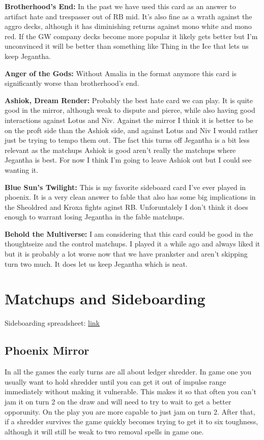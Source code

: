 \documentclass[12pt]{article}
\begin{document}
\vspace{0.4em}
\noindent \textbf{Brotherhood's End:}
In the past we have used this card as an answer to artifact hate and trespasser out of RB mid. It's also fine as a wrath against the aggro decks, although it has diminishing returns against mono white and mono red. If the GW company decks become more popular it likely gets better but I'm unconvinced it will be better than something like Thing in the Ice that lets us keep Jegantha.

\vspace{0.4em}
\noindent \textbf{Anger of the Gods:}
Without Amalia in the format anymore this card is significantly worse than brotherhood's end.

\vspace{0.4em}
\noindent \textbf{Ashiok, Dream Render:}
Probably the best hate card we can play. It is quite good in the mirror, although weak to dispute and pierce, while also having good interactions against Lotus and Niv. Against the mirror I think it is better to be on the proft side than the Ashiok side, and against Lotus and Niv I would rather just be trying to tempo them out. The fact this turns off Jegantha is a bit less relevant as the matchups Ashiok is good aren't really the matchups where Jegantha is best. For now I think I'm going to leave Ashiok out but I could see wanting it.

\vspace{0.4em}
\noindent \textbf{Blue Sun's Twilight:}
This is my favorite sideboard card I've ever played in phoenix. It is a very clean answer to fable that also has some big implications in the Sheoldred and Kroxa fights aginst RB. Unforuntalely I don't think it does enough to warrant losing Jegantha in the fable matchups.

\vspace{0.4em}
\noindent \textbf{Behold the Multiverse:}
I am considering that this card could be good in the thoughtseize and the control matchups. I played it a while ago and always liked it but it is probably a lot worse now that we have prankster and aren't skipping turn two much. It does let us keep Jegantha which is neat.

\clearpage
\section{Matchups and Sideboarding}
Sideboarding spreadsheet: \href{https://docs.google.com/spreadsheets/d/1DheUoGrQmpuwzbMDpPVJHcCrfe7UOyXSMSSkL8aXnv0/edit?gid=1532833725}{link}
\subsection{Phoenix Mirror}
In all the games the early turns are all about ledger shredder. In game one you usually want to hold shredder until you can get it out of impulse range immediately without making it vulnerable. This makes it so that often you can't jam it on turn 2 on the draw and will need to try to wait to get a better opporunity. On the play you are more capable to just jam on turn 2. After that, if a shredder survives the game quickly becomes trying to get it to six toughness, although it will still be weak to two removal spells in game one.
\end{document}
